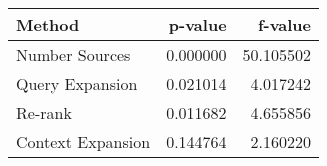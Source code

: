 \begin{tabular}{lrr}
\toprule
Method & p-value & f-value \\
\midrule
Number Sources & 0.000000 & 50.105502 \\
Query Expansion & 0.021014 & 4.017242 \\
Re-rank & 0.011682 & 4.655856 \\
Context Expansion & 0.144764 & 2.160220 \\
\bottomrule
\end{tabular}
